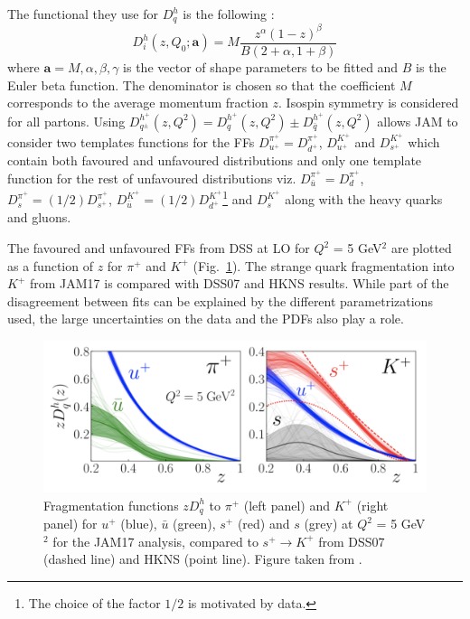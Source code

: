 The functional they use for $D^h_q$ is the following :
%
\begin{equation}
  D^h_i (z,Q_0;\textbf{a}) = M \frac{z^{\alpha}(1-z)^{\beta}}{B(2+\alpha,1+\beta)}
  \label{eq:JAMparam}
\end{equation}
%
where $\textbf{a} = {M,\alpha,\beta,\gamma}$ is the vector of shape parameters to be fitted and $B$ is the Euler beta function. The denominator is chosen so that the coefficient $M$ corresponds to the average momentum fraction $z$. Isospin symmetry is considered for all partons. Using $D^{h^{+}}_{q^{\pm}}(z,Q^2) = D^{h^{+}}_{q}(z,Q^2) \pm D^{h^{+}}_{\bar{q}}(z,Q^2)$ allows JAM to consider two templates functions for the FFs $D^{\pi^{+}}_{u^{+}} = D^{\pi^{+}}_{d^{+}}$, $D^{K^{+}}_{u^{+}}$ and $D^{K^{+}}_{s^{+}}$ which contain both favoured and unfavoured distributions and only one template function for the rest of unfavoured distributions viz. $D^{\pi^{+}}_{\bar{u}} = D^{\pi^{+}}_{d}$, $D^{\pi^{+}}_{s} = (1/2)D^{\pi^{+}}_{s^{+}}$, $D^{K^{+}}_{\bar{u}} = (1/2)D^{K^{+}}_{d^{+}}$\footnote{The choice of the factor $1/2$ is motivated by data.} and $D^{K^{+}}_{s}$ along with the heavy quarks and gluons.

The favoured and unfavoured FFs from DSS at LO for $Q^2$ = 5 GeV$^2$ are plotted as a function of $z$ for $\pi^+$ and $K^+$ (Fig.~\ref{pic:JAMcomp}). The strange quark fragmentation into $K^+$ from JAM17 is compared with DSS07 and HKNS results. While part of the disagreement between fits can be explained by the different parametrizations used, the large uncertainties on the data and the PDFs also play a role.

\begin{figure}[!h]
  \centering
	\includegraphics[scale=0.5]{./gfx/JAMcomp.png}
	\caption{Fragmentation functions $zD^h_q$ to $\pi^+$ (left panel) and $K^+$ (right panel) for $u^+$ (blue), $\bar{u}$ (green), $s^+$ (red) and $s$ (grey) at $Q^2$ = 5 GeV$^2$ for the JAM17 analysis, compared to $s^+ \rightarrow K^+$ from DSS07 (dashed line) and HKNS (point line). Figure taken from \cite{JAM}.}
	\label{pic:JAMcomp}
\end{figure}

